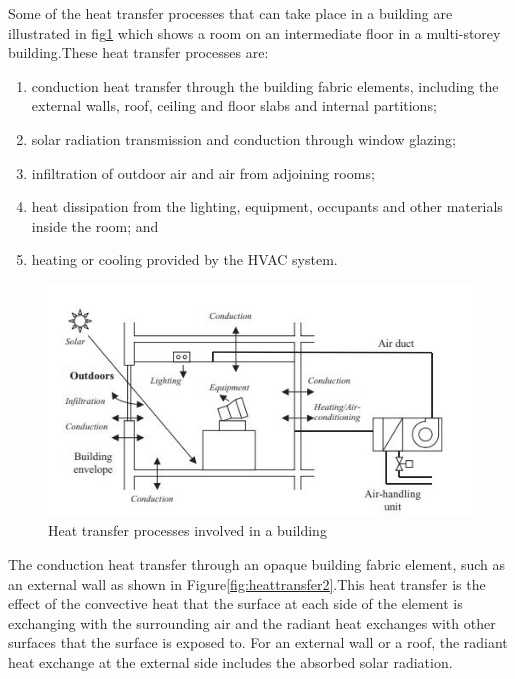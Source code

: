 \documentclass[a4paper,12pt]{article}
\numberwithin{equation}{section}
\begin{document}
Some of the heat transfer processes that can take place in a building are illustrated in fig\ref{fig:heattransfer1} which shows a room on an intermediate floor in a multi-storey building.These heat transfer processes are:
\begin{enumerate}
    \item conduction heat transfer through the building fabric elements, including the external
walls, roof, ceiling and floor slabs and internal partitions;
    \item solar radiation transmission and conduction through window glazing;
    \item infiltration of outdoor air and air from adjoining rooms;
    \item heat dissipation from the lighting, equipment, occupants and other materials inside the room; and
    \item heating or cooling  provided by the HVAC system.
\end{enumerate}

\begin{figure}[H]
    \includegraphics[scale=1.3]{heat_transfer.JPG}
    \centering
    \caption{Heat transfer processes involved in a building}
    \label{fig:heattransfer1}
\end{figure}

The conduction heat transfer through an opaque building fabric element, such as an external
wall as shown in Figure\ref{fig:heattransfer2}.This heat transfer is the effect of the convective heat that the surface at each side of the element is exchanging with the surrounding air and the radiant heat exchanges with other surfaces that the surface is exposed to. For an external wall or a roof, the radiant heat exchange at the external side includes the absorbed solar radiation.
\end{document}
